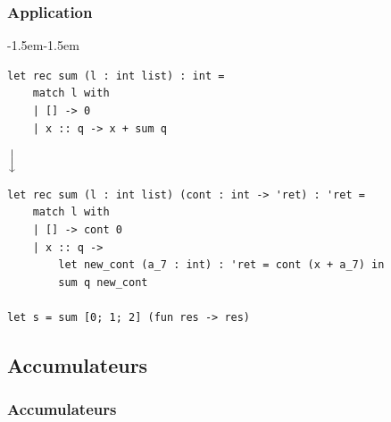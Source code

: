 \begin{frame}[fragile]
    \frametitle{Application}

    \begin{adjustwidth}{-1.5em}{-1.5em}

        \small \begin{verbatim}
let rec sum (l : int list) : int =
    match l with
    | [] -> 0
    | x :: q -> x + sum q
        \end{verbatim}

        \vspace{0.2cm}
        \begin{center}
            $\Big\downarrow$
        \end{center}
        \vspace{0.2cm}

        \small \begin{verbatim}
let rec sum (l : int list) (cont : int -> 'ret) : 'ret =
    match l with
    | [] -> cont 0
    | x :: q ->
        let new_cont (a_7 : int) : 'ret = cont (x + a_7) in
        sum q new_cont

let s = sum [0; 1; 2] (fun res -> res)
        \end{verbatim}

    \end{adjustwidth}
\end{frame}

\subsection{Accumulateurs}

\begin{frame}[t]
    \frametitle{Accumulateurs}

    \begin{center}
    \end{center}
\end{frame}

